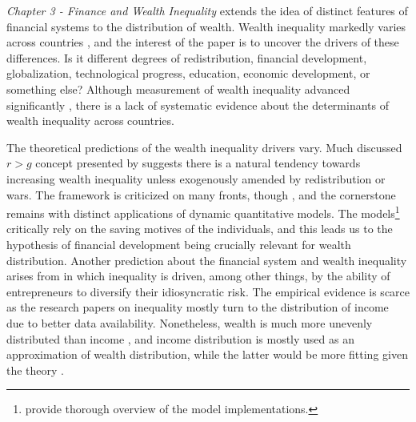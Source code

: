 \begin{refsection}
\emph{Chapter 3 - Finance and Wealth Inequality} extends the idea of distinct features of financial systems to the distribution of wealth. Wealth inequality markedly varies across countries \parencite{daviesetal2017}, and the interest of the paper is to uncover the drivers of these differences. Is it different degrees of redistribution, financial development, globalization, technological progress, education, economic development, or something else? Although measurement of wealth inequality advanced significantly \parencite{daviesetal2017,SaezZucman2016}, there is a lack of systematic evidence about the determinants of wealth inequality across countries.

The theoretical predictions of the wealth inequality drivers vary. Much discussed $r > g$ concept presented by \textcite{piketty2014} suggests there is a natural tendency towards increasing wealth inequality unless exogenously amended by redistribution or wars. The framework is criticized on many fronts, though \parencite{mankiw2015yes,blume2015capital,king2017literature}, and the cornerstone remains with distinct applications of dynamic quantitative models. The models\footnote{\textcite{DENARDI2017280} provide thorough overview of the model implementations.} critically rely on the saving motives of the individuals, and this leads us to the hypothesis of financial development being crucially relevant for wealth distribution. Another prediction about the financial system and wealth inequality arises from \textcite{pastor2016income} in which inequality is driven, among other things, by the ability of entrepreneurs to diversify their idiosyncratic risk. The empirical evidence is scarce as the research papers on inequality mostly turn to the distribution of income due to better data availability. Nonetheless, wealth is much more unevenly distributed than income \textcite{zucman2019,oecd2013crisis}, and income distribution is mostly used as an approximation of wealth distribution, while the latter would be more fitting given the theory \parencite{bagchi2015does}.


\end{refsection}

